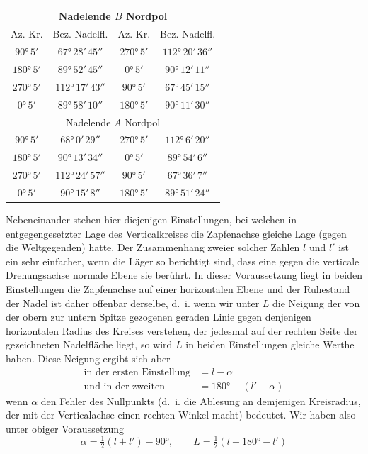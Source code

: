\documentclass[12pt,a4paper]{article}
\begin{document}
\begin{center}
\small
\begin{tabular}{|cc|cc|}
\hline
\multicolumn{4}{|c|}{Nadelende $B$ Nordpol} \\
\hline
Az. Kr. & Bez. Nadelfl. & Az. Kr. & Bez. Nadelfl. \\
\hline
$90°\,5'$ & $67°\,28'\,45''$ & $270°\,5'$ & $112°\,20'\,36''$ \\
$180°\,5'$ & $89°\,52'\,45''$ & $0°\,5'$ & $90°\,12'\,11''$ \\
$270°\,5'$ & $112°\,17'\,43''$ & $90°\,5'$ & $67°\,45'\,15''$ \\
$0°\,5'$ & $89°\,58'\,10''$ & $180°\,5'$ & $90°\,11'\,30''$ \\
\hline
\multicolumn{4}{|c|}{Nadelende $A$ Nordpol} \\
\hline
$90°\,5'$ & $68°\,0'\,29''$ & $270°\,5'$ & $112°\,6'\,20''$ \\
$180°\,5'$ & $90°\,13'\,34''$ & $0°\,5'$ & $89°\,54'\,6''$ \\
$270°\,5'$ & $112°\,24'\,57''$ & $90°\,5'$ & $67°\,36'\,7''$ \\
$0°\,5'$ & $90°\,15'\,8''$ & $180°\,5'$ & $89°\,51'\,24''$ \\
\hline
\end{tabular}
\end{center}

Nebeneinander stehen hier diejenigen Einstellungen, bei welchen in entgegengesetzter Lage des Verticalkreises die Zapfenachse gleiche Lage (gegen die Weltgegenden) hatte. Der Zusammenhang zweier solcher Zahlen $l$ und $l'$ ist ein sehr einfacher, wenn die Läger so berichtigt sind, dass eine gegen die verticale Drehungsachse normale Ebene sie berührt. In dieser Voraussetzung liegt in beiden Einstellungen die Zapfenachse auf einer horizontalen Ebene und der Ruhestand der Nadel ist daher offenbar derselbe, d.~i. wenn wir unter $L$ die Neigung der von der obern zur untern Spitze gezogenen geraden Linie gegen denjenigen horizontalen Radius des Kreises verstehen, der jedesmal auf der rechten Seite der gezeichneten Nadelfläche liegt, so wird $L$ in beiden Einstellungen gleiche Werthe haben. Diese Neigung ergibt sich aber
\begin{align*}
\text{in der ersten Einstellung} &= l - \alpha \\
\text{und in der zweiten} &= 180° - (l' + \alpha)
\end{align*}
wenn $\alpha$ den Fehler des Nullpunkts (d.~i. die Ablesung an demjenigen Kreisradius, der mit der Verticalachse einen rechten Winkel macht) bedeutet. Wir haben also unter obiger Voraussetzung
\[ \alpha = \tfrac{1}{2}(l + l') - 90°, \qquad L = \tfrac{1}{2}(l + 180° - l') \]
\end{document}
